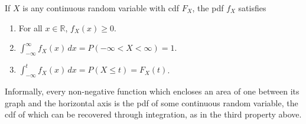 \begin{proposition}If $X$ is any continuous random variable with cdf $F_X$, the pdf $f_X$ satisfies
\vspace{-0.25em}
\begin{enumerate}
\item For all $x \in \mathbb{R}$, $f_X(x) \geq 0$.
\item $\int_{-\infty}^{\infty} f_X(x) \, dx = P(-\infty < X < \infty) = 1$.
\item $\int_{-\infty}^{t} f_X(x) \, dx = P(X \leq t) = F_X(t)$.
\end{enumerate}
\end{proposition}

Informally, every non-negative function which encloses an area of one between its graph and the horizontal axis is the pdf of some continuous random variable, the cdf of which can be recovered through integration, as in the third property above.

